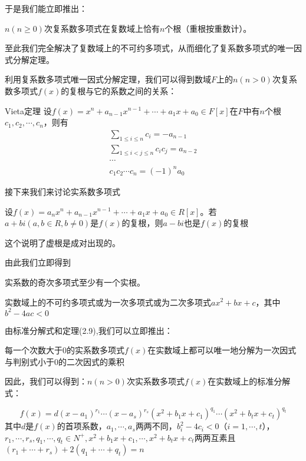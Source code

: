 \documentclass[lang=cn,10pt]{elegantbook}
\begin{document}
于是我们能立即推出：

\begin{corollary}
	$n(n\geq0)$次复系数多项式在复数域上恰有$n$个根（重根按重数计）。
\end{corollary}
至此我们完全解决了复数域上的不可约多项式，从而细化了复系数多项式的唯一因式分解定理。

利用复系数多项式唯一因式分解定理，我们可以得到数域$F$上的$n(n>0)$次复系数多项式$f(x)$的复根与它的系数之间的关系：

\begin{theorem}{Vieta定理}
	设$f(x)=x^n+a_{n-1}x^{n-1}+\cdots+a_1x+a_0\in F[x]$在$F$中有$n$个根$c_1,c_2,\cdots,c_n$，则有
	\begin{equation}
		\begin{split}
			\sum_{1\le i\le n} c_i=-a_{n-1}
			\\
			\sum_{1\le i<j\le n}{c_ic_j}=a_{n-2}
			\\
			\cdots
			\\
			c_1c_2\cdots c_n=(-1)^na_0
		\end{split}
	\end{equation}
\end{theorem}
接下来我们来讨论实系数多项式
\begin{theorem}
	设$f(x)=a_nx^n+a_{n-1}x^{n-1}+\cdots+a_1x+a_0\in R[x]$。若$a+bi(a,b\in R,b\neq0)$是$f(x)$的复根，则$a-bi$也是$f(x)$的复根
\end{theorem}
这个说明了虚根是成对出现的。

由此我们立即得到
\begin{corollary}
	实系数的奇次多项式至少有一个实根。
\end{corollary}
\begin{theorem}
	实数域上的不可约多项式或为一次多项式或为二次多项式$ax^2+bx+c$，其中$b^2-4ac<0$
\end{theorem}
由标准分解式和定理(2.9),我们可以立即推出：
\begin{theorem}[实系数多项式唯一因式分解定理]
	每一个次数大于0的实系数多项式$f(x)$在实数域上都可以唯一地分解为一次因式与判别式小于0的二次因式的乘积
\end{theorem}
因此，我们可以得到：$n(n>0)$次实系数多项式$f(x)$在实数域上的标准分解式：

\begin{equation}
	f(x)=d(x-a_1)^{r_1}\cdots(x-a_s)^{r_s}(x^2+b_1x+c_1)^{q_1}\cdots(x^2+b_tx+c_t)^{q_t}
\end{equation}
其中$d$是$f(x)$的首项系数，$a_1,\cdots,a_s$两两不同，$b_i^2-4c_i<0$（$i=1,\cdots,t$），
$r_1,\cdots,r_s,q_1,\cdots,q_t\in N^+,x^2+b_1x+c_1,\cdots,x^2+b_tx+c_t$两两互素且
$(r_1+\cdots+r_s)+2(q_1+\cdots+q_t)=n$
\end{document}

